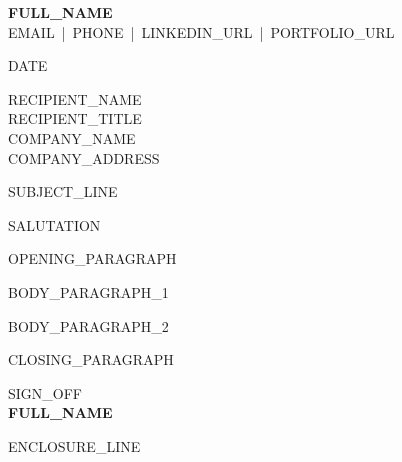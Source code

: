 \documentclass[a4paper,11pt]{article}
\begin{document}
\begin{center}
  \textbf{{{FULL_NAME}}}\\
  {{EMAIL}} \,|\, {{PHONE}} \,|\, {{LINKEDIN_URL}} \,|\, {{PORTFOLIO_URL}}\\
\end{center}
\vspace{1em}

{{DATE}}

\vspace{1em}
{{RECIPIENT_NAME}}\\
{{RECIPIENT_TITLE}}\\
{{COMPANY_NAME}}\\
{{COMPANY_ADDRESS}}

\vspace{1.5em}
{{SUBJECT_LINE}}

\vspace{1em}
{{SALUTATION}}

{{OPENING_PARAGRAPH}}

{{BODY_PARAGRAPH_1}}

{{BODY_PARAGRAPH_2}}

{{CLOSING_PARAGRAPH}}

\vspace{2em}
{{SIGN_OFF}}\\[2.5em]
\textbf{{{FULL_NAME}}}

\vspace{2em}
{{ENCLOSURE_LINE}}
\end{document}
